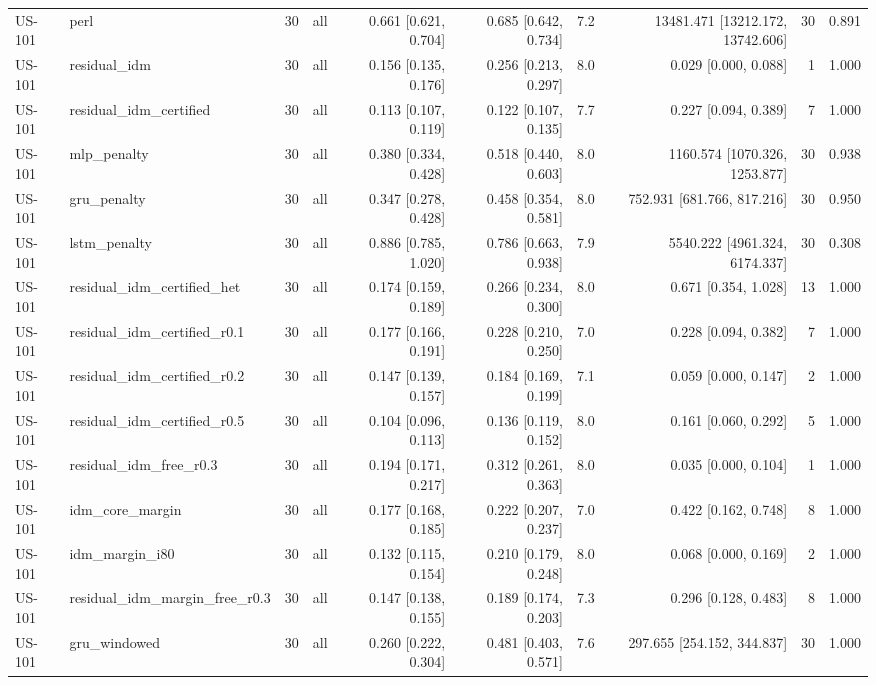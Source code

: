 \begin{table}[htbp]
{\begin{tabular}{llrlrrrrrr}
US-101 & perl & 30 & all & 0.661 [0.621, 0.704] & 0.685 [0.642, 0.734] & 7.2 & 13481.471 [13212.172, 13742.606] & 30 & 0.891 \\
US-101 & residual\_idm & 30 & all & 0.156 [0.135, 0.176] & 0.256 [0.213, 0.297] & 8.0 & 0.029 [0.000, 0.088] & 1 & 1.000 \\
US-101 & residual\_idm\_certified & 30 & all & 0.113 [0.107, 0.119] & 0.122 [0.107, 0.135] & 7.7 & 0.227 [0.094, 0.389] & 7 & 1.000 \\
US-101 & mlp\_penalty & 30 & all & 0.380 [0.334, 0.428] & 0.518 [0.440, 0.603] & 8.0 & 1160.574 [1070.326, 1253.877] & 30 & 0.938 \\
US-101 & gru\_penalty & 30 & all & 0.347 [0.278, 0.428] & 0.458 [0.354, 0.581] & 8.0 & 752.931 [681.766, 817.216] & 30 & 0.950 \\
US-101 & lstm\_penalty & 30 & all & 0.886 [0.785, 1.020] & 0.786 [0.663, 0.938] & 7.9 & 5540.222 [4961.324, 6174.337] & 30 & 0.308 \\
US-101 & residual\_idm\_certified\_het & 30 & all & 0.174 [0.159, 0.189] & 0.266 [0.234, 0.300] & 8.0 & 0.671 [0.354, 1.028] & 13 & 1.000 \\
US-101 & residual\_idm\_certified\_r0.1 & 30 & all & 0.177 [0.166, 0.191] & 0.228 [0.210, 0.250] & 7.0 & 0.228 [0.094, 0.382] & 7 & 1.000 \\
US-101 & residual\_idm\_certified\_r0.2 & 30 & all & 0.147 [0.139, 0.157] & 0.184 [0.169, 0.199] & 7.1 & 0.059 [0.000, 0.147] & 2 & 1.000 \\
US-101 & residual\_idm\_certified\_r0.5 & 30 & all & 0.104 [0.096, 0.113] & 0.136 [0.119, 0.152] & 8.0 & 0.161 [0.060, 0.292] & 5 & 1.000 \\
US-101 & residual\_idm\_free\_r0.3 & 30 & all & 0.194 [0.171, 0.217] & 0.312 [0.261, 0.363] & 8.0 & 0.035 [0.000, 0.104] & 1 & 1.000 \\
US-101 & idm\_core\_margin & 30 & all & 0.177 [0.168, 0.185] & 0.222 [0.207, 0.237] & 7.0 & 0.422 [0.162, 0.748] & 8 & 1.000 \\
US-101 & idm\_margin\_i80 & 30 & all & 0.132 [0.115, 0.154] & 0.210 [0.179, 0.248] & 8.0 & 0.068 [0.000, 0.169] & 2 & 1.000 \\
US-101 & residual\_idm\_margin\_free\_r0.3 & 30 & all & 0.147 [0.138, 0.155] & 0.189 [0.174, 0.203] & 7.3 & 0.296 [0.128, 0.483] & 8 & 1.000 \\
US-101 & gru\_windowed & 30 & all & 0.260 [0.222, 0.304] & 0.481 [0.403, 0.571] & 7.6 & 297.655 [254.152, 344.837] & 30 & 1.000 \\

\end{tabular}}
\end{table}
